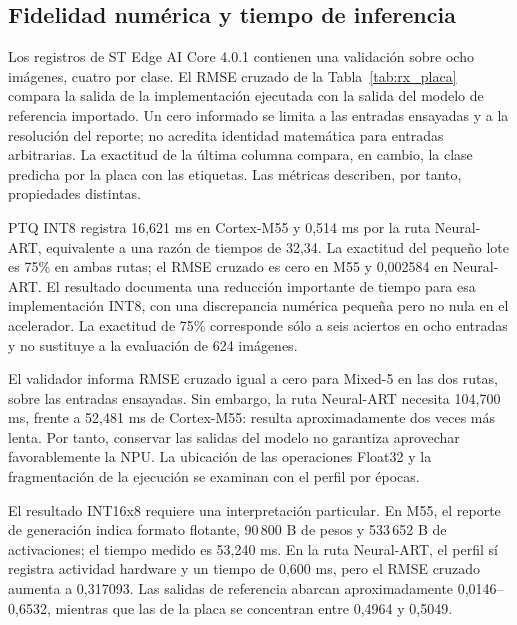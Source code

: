 \subsection{Fidelidad numérica y tiempo de inferencia}
Los registros de ST Edge AI Core 4.0.1 contienen una validación sobre ocho imágenes, cuatro por clase. El RMSE cruzado de la Tabla~\ref{tab:rx_placa} compara la salida de la implementación ejecutada con la salida del modelo de referencia importado. Un cero informado se limita a las entradas ensayadas y a la resolución del reporte; no acredita identidad matemática para entradas arbitrarias. La exactitud de la última columna compara, en cambio, la clase predicha por la placa con las etiquetas. Las métricas describen, por tanto, propiedades distintas.


PTQ INT8 registra 16,621 ms en Cortex-M55 y 0,514 ms por la ruta Neural-ART, equivalente a una razón de tiempos de 32,34. La exactitud del pequeño lote es 75\% en ambas rutas; el RMSE cruzado es cero en M55 y 0,002584 en Neural-ART. El resultado documenta una reducción importante de tiempo para esa implementación INT8, con una discrepancia numérica pequeña pero no nula en el acelerador. La exactitud de 75\% corresponde sólo a seis aciertos en ocho entradas y no sustituye a la evaluación de 624 imágenes.

El validador informa RMSE cruzado igual a cero para Mixed-5 en las dos rutas, sobre las entradas ensayadas. Sin embargo, la ruta Neural-ART necesita 104,700 ms, frente a 52,481 ms de Cortex-M55: resulta aproximadamente dos veces más lenta. Por tanto, conservar las salidas del modelo no garantiza aprovechar favorablemente la NPU. La ubicación de las operaciones Float32 y la fragmentación de la ejecución se examinan con el perfil por épocas.

El resultado INT16x8 requiere una interpretación particular. En M55, el reporte de generación indica formato flotante, 90\,800 B de pesos y 533\,652 B de activaciones; el tiempo medido es 53,240 ms. En la ruta Neural-ART, el perfil sí registra actividad hardware y un tiempo de 0,600 ms, pero el RMSE cruzado aumenta a 0,317093. Las salidas de referencia abarcan aproximadamente 0,0146--0,6532, mientras que las de la placa se concentran entre 0,4964 y 0,5049.

